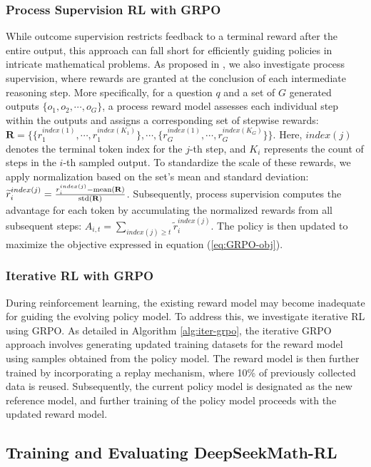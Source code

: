 \begin{itemize}[topsep=0pt]
\begin{itemize}[topsep=0pt]
\subsubsection{Process Supervision RL with GRPO} While outcome supervision restricts feedback to a terminal reward after the entire output, this approach can fall short for efficiently guiding policies in intricate mathematical problems. As proposed in \cite{wang2023math}, we also investigate process supervision, where rewards are granted at the conclusion of each intermediate reasoning step. More specifically, for a question $q$ and a set of $G$ generated outputs $\{o_1, o_2, \cdots, o_G\}$, a process reward model assesses each individual step within the outputs and assigns a corresponding set of stepwise rewards: $\mathbf{R} = \{ \{r_1^{index(1)},\cdots,r_1^{index(K_1)}\}, \cdots,  \{r_G^{index(1)},\cdots,r_G^{index(K_G)}\} \}$. Here, $index(j)$ denotes the terminal token index for the $j$-th step, and $K_i$ represents the count of steps in the $i$-th sampled output. To standardize the scale of these rewards, we apply normalization based on the set’s mean and standard deviation: $\widetilde{r}_i^{index(j)} = \frac{r_i^{index(j)} - {\rm mean(\mathbf{R})}}{{\rm std(\mathbf{R})}}$. 
Subsequently, process supervision computes the advantage for each token by accumulating the normalized rewards from all subsequent steps: $\hat{A}_{i, t} = \sum_{index(j) \ge t} \widetilde{r}_i^{index(j)}$. The policy is then updated to maximize the objective expressed in equation (\ref{eq:GRPO-obj}).

\subsubsection{Iterative RL with GRPO} During reinforcement learning, the existing reward model may become inadequate for guiding the evolving policy model. To address this, we investigate iterative RL using GRPO. As detailed in Algorithm \ref{alg:iter-grpo}, the iterative GRPO approach involves generating updated training datasets for the reward model using samples obtained from the policy model. The reward model is then further trained by incorporating a replay mechanism, where 10\% of previously collected data is reused. Subsequently, the current policy model is designated as the new reference model, and further training of the policy model proceeds with the updated reward model.

\subsection{Training and Evaluating DeepSeekMath-RL}


\end{itemize}
\end{itemize}
